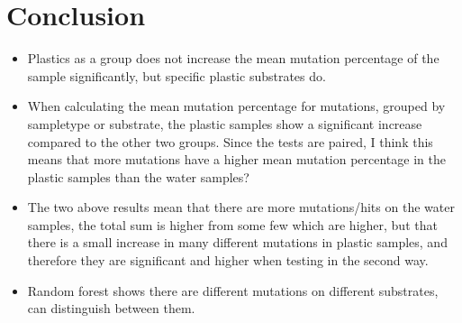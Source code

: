 \chapter{Conclusion}

\begin{itemize}
    \item Plastics as a group does not increase the mean mutation percentage of the sample significantly, but specific plastic substrates do.
    \item When calculating the mean mutation percentage for mutations, grouped by sampletype or substrate, the plastic samples show a significant increase compared to the other two groups. Since the tests are paired, I think this means that more mutations have a higher mean mutation percentage in the plastic samples than the water samples?
    \item The two above results mean that there are more mutations/hits on the water samples, the total sum is higher from some few which are higher, but that there is a small increase in many different mutations in plastic samples, and therefore they are significant and higher when testing in the second way.
    \item Random forest shows there are different mutations on different substrates, can distinguish between them.
\end{itemize}
